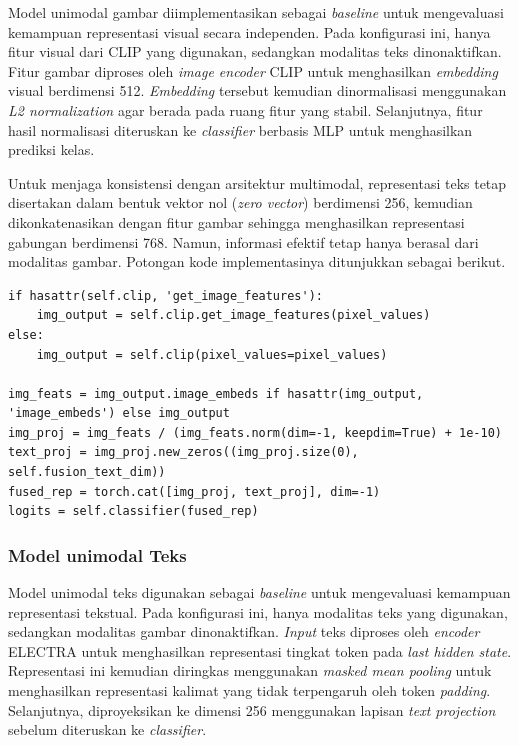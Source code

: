 Model unimodal gambar diimplementasikan sebagai \textit{baseline} untuk mengevaluasi kemampuan representasi visual secara independen. Pada konfigurasi ini, hanya fitur visual dari CLIP yang digunakan, sedangkan modalitas teks dinonaktifkan. Fitur gambar diproses oleh \textit{image encoder} CLIP untuk menghasilkan \textit{embedding} visual berdimensi 512. \textit{Embedding} tersebut kemudian dinormalisasi menggunakan \textit{L2 normalization} agar berada pada ruang fitur yang stabil. Selanjutnya, fitur hasil normalisasi diteruskan ke \textit{classifier} berbasis MLP untuk menghasilkan prediksi kelas.

Untuk menjaga konsistensi dengan arsitektur multimodal, representasi teks tetap disertakan dalam bentuk vektor nol (\textit{zero vector}) berdimensi 256, kemudian dikonkatenasikan dengan fitur gambar sehingga menghasilkan representasi gabungan berdimensi 768. Namun, informasi efektif tetap hanya berasal dari modalitas gambar. Potongan kode implementasinya ditunjukkan sebagai berikut.

\begin{lstlisting}[caption={Kode implementasi model unimodal gambar}, label={code:4.unimodal_gambar}]
if hasattr(self.clip, 'get_image_features'):
    img_output = self.clip.get_image_features(pixel_values)
else:
    img_output = self.clip(pixel_values=pixel_values)

img_feats = img_output.image_embeds if hasattr(img_output, 'image_embeds') else img_output
img_proj = img_feats / (img_feats.norm(dim=-1, keepdim=True) + 1e-10)
text_proj = img_proj.new_zeros((img_proj.size(0), self.fusion_text_dim))
fused_rep = torch.cat([img_proj, text_proj], dim=-1)
logits = self.classifier(fused_rep)
\end{lstlisting}

\subsubsection{Model unimodal Teks}
\label{IV.Model.Konfigurasi.UnimodalTeks}

Model unimodal teks digunakan sebagai \textit{baseline} untuk mengevaluasi kemampuan representasi tekstual. Pada konfigurasi ini, hanya modalitas teks yang digunakan, sedangkan modalitas gambar dinonaktifkan. \textit{Input} teks diproses oleh \textit{encoder} ELECTRA untuk menghasilkan representasi tingkat token pada \textit{last hidden state}. Representasi ini kemudian diringkas menggunakan \textit{masked mean pooling} untuk menghasilkan representasi kalimat yang tidak terpengaruh oleh token \textit{padding}. Selanjutnya,  diproyeksikan ke dimensi 256 menggunakan lapisan \textit{text projection} sebelum diteruskan ke \textit{classifier}.

